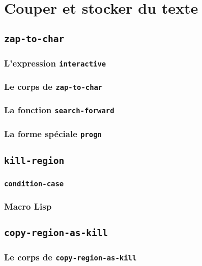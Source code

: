 \chapter{Couper et stocker du texte}

\section{\texttt{zap-to-char}}

\subsection{L'expression \texttt{interactive}}

\subsection{Le corps de \texttt{zap-to-char}}

\subsection{La fonction \texttt{search-forward}}

\subsection{La forme spéciale \texttt{progn}}

\section{\texttt{kill-region}}

\subsection{\texttt{condition-case}}

\subsection{Macro Lisp}

\section{\texttt{copy-region-as-kill}}

\subsection{Le corps de \texttt{copy-region-as-kill}}

